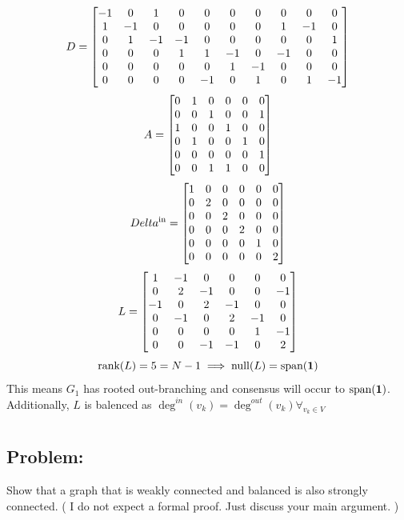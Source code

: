 \documentclass[]{article}
\numberwithin{equation}{section}
\begin{document}
\[
    D = \mqty[
        -1 & 0  & 1  & 0  & 0  & 0  & 0  & 0  & 0  & 0  \\
        1  & -1 & 0  & 0  & 0  & 0  & 0  & 1  & -1 & 0  \\
        0  & 1  & -1 & -1 & 0  & 0  & 0  & 0  & 0  & 1  \\
        0  & 0  & 0  & 1  & 1  & -1 & 0  & -1 & 0  & 0  \\
        0  & 0  & 0  & 0  & 0  & 1  & -1 & 0  & 0  & 0  \\
        0  & 0  & 0  & 0  & -1 & 0  & 1  & 0  & 1  & -1
    ]
\]\[
    A = \mqty[
        0 & 1 & 0 & 0 & 0 & 0 \\
        0 & 0 & 1 & 0 & 0 & 1 \\
        1 & 0 & 0 & 1 & 0 & 0 \\
        0 & 1 & 0 & 0 & 1 & 0 \\
        0 & 0 & 0 & 0 & 0 & 1 \\
        0 & 0 & 1 & 1 & 0 & 0
    ]
\]\[
    Delta^{\text{in}} = \mqty[
        1 & 0 & 0 & 0 & 0 & 0 \\
        0 & 2 & 0 & 0 & 0 & 0 \\
        0 & 0 & 2 & 0 & 0 & 0 \\
        0 & 0 & 0 & 2 & 0 & 0 \\
        0 & 0 & 0 & 0 & 1 & 0 \\
        0 & 0 & 0 & 0 & 0 & 2
    ]
\]\[
    L = \mqty[
        1  & -1 & 0  & 0  & 0  & 0  \\
        0  & 2  & -1 & 0  & 0  & -1 \\
        -1 & 0  & 2  & -1 & 0  & 0  \\
        0  & -1 & 0  & 2  & -1 & 0  \\
        0  & 0  & 0  & 0  & 1  & -1 \\
        0  & 0  & -1 & -1 & 0  & 2
    ]
\] \[
    \text{rank}(L) = 5 = N-1 \implies \text{null}(L) = \text{span}(\vb{1})
\] This means $G_1$ has rooted out-branching and consensus will occur to $\text{span}(\vb{1})$.
Additionally, $L$ is balenced as $\deg^{in}(v_k) = \deg^{out}(v_k) \forall_{v_k \in V}$




\newpage
\section{}
\subsection*{Problem:}
Show that a graph that is weakly connected and balanced is also strongly connected.
(
    I do not expect a formal proof.
    Just discuss your main argument.
)
\end{document}
